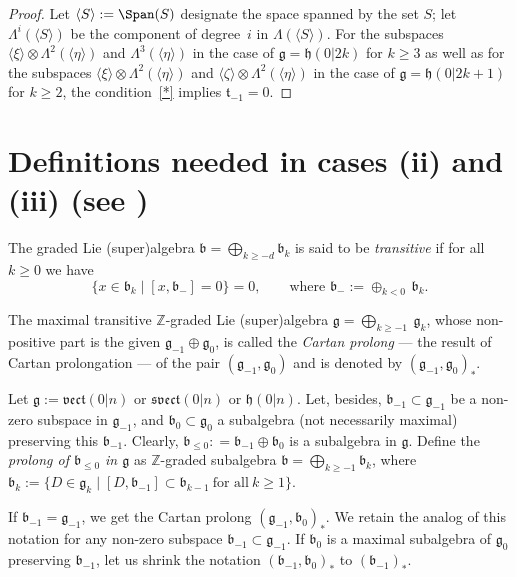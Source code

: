 \documentclass[pdftex]{sigma}
\newcommand {\Zee} {{\mathbb Z}}
\newcommand {\fb} {{\mathfrak{b}}}
\newcommand {\fg} {{\mathfrak{g}}} %
\newcommand {\fh} {{\mathfrak{h}}}
\newcommand {\fsvect} {{\mathfrak{svect}}}
\newcommand {\ft} {{\mathfrak{t}}}
\newcommand {\fvect} {{\mathfrak{vect}}} %
\newcommand {\<} [2] {{\left.\vphantom{#2}\right.^{#1\!}\!{#2}}}
\numberwithin{equation}{section}
\begin{document}
\begin{proof}
Let $\langle S\rangle:=\Span(S)$ designate the space spanned by the set $S$; let $\Lambda^i(\langle S\rangle )$ be the component of degree~$i$ in $\Lambda(\langle S\rangle)$.
For the subspaces $\langle \xi\rangle \otimes \Lambda^2(\langle \eta\rangle )$ and $\Lambda^3(\langle \eta\rangle )$ in the case of $\fg=\fh(0|2k)$ for $k\geq 3$ as well as for the subspaces $\langle \xi\rangle \otimes \Lambda^2(\langle \eta\rangle )$ and $\langle \zeta\rangle \otimes \Lambda^2(\langle \eta\rangle )$ in the case of $\fg=\fh(0|2k+1)$ for $k\geq 2$, the condition~\eqref{*} implies $\ft_{-1}=0$.
\end{proof}

\section{Definitions needed in cases (ii) and (iii) (see \cite{Shch})}\label{Defs} The graded Lie (super)algebra
$\fb=\bigoplus_{k \geqslant -d} \fb_k$
is said to be \textit{transitive} if for all~$k\geq 0$ we have
\begin{equation*}
\{x\in \fb_k \mid [x,\fb_{-}]=0\}=0, \qquad \text{where $\fb_{-}:=\oplus _{k <0}\,\fb_k$}.
\end{equation*}

The maximal transitive $\Zee$-graded Lie (super)algebra $\fg=\bigoplus_{k \geqslant -1}\ \fg_k$, whose non-positive part is the given $\fg_{-1}\oplus \fg_0$, is called the \textit{Cartan prolong}
--- the result of Cartan prolongation --- of the pair $(\fg_{-1},\fg_0)$ and is denoted by $(\fg_{-1},\fg_0)_*$.

Let $\fg := \fvect(0|n)$ or $\fsvect(0|n)$ or $\fh(0|n)$. Let, besides, $\fb_{-1} \subset \fg_{-1}$ be a non-zero subspace in $\fg_{-1}$, and $\fb_0 \subset \fg_0$ a subalgebra (not necessarily maximal) preserving this $\fb_{-1}$. Clearly, $\fb_{\leq 0}: = \fb_{-1} \oplus
\fb_0$ is a subalgebra in $\fg$. Define the \textit{prolong of
$\fb_{\leq 0}$ in $\fg$} as $\Zee$-graded subalgebra $\fb = \bigoplus_{k\geq -1}\fb_k$, where
$
\fb_k := \{D\in \fg_k \mid [D, \fb_{-1}] \subset \fb_{k-1}\ \text{for all} \ k \geq 1\}$.

If $\fb_{-1} = \fg_{-1}$, we get the
Cartan prolong
$(\fg_{-1}, \fb_0)_*$. We retain the analog of this notation for any non-zero subspace $\fb_{-1}\subset\fg_{-1}$. If $\fb_0$ is a maximal subalgebra of $\fg_0$ preserving $\fb_{-1}$, let us shrink the notation $(\fb_{-1}, \fb_0)_*$ to $(\fb_{-1})_*$.
\end{document}
